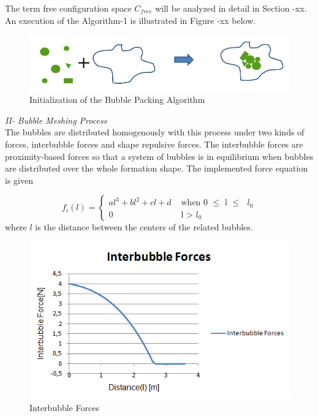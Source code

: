 \documentclass[twoside]{article}
\begin{document}
		The term free configuration space $C_{free}$ will be analyzed in detail in Section -xx. An execution of the Algorithm-1 is illustrated in Figure -xx below.
		
				\begin{figure}[H]
					\caption{Initialization of the Bubble Packing Algorithm}
					\centering
					\includegraphics[scale = 0.50]{bubble_packing}
				\end{figure}
				

			\textit{			II- Bubble Meshing Process } \\ 
	
		
		The bubbles are distributed homogenously with this process under two kinds of forces, interbubble forces and shape repulsive forces. The interbubble forces are proximity-based forces so that a system of bubbles is in equilibrium when bubbles are distributed over the whole formation shape. The implemented force equation is given
		
		\begin{equation}
		f_i(l) = \left\{ \begin{array}{rl}
		al^3 + bl^2 + cl + d &\mbox{ when 0 $\leq$ l $\leq$ $l_0$} \\
		0                               &\mbox{ l > $l_0$}
		\end{array} \right.
		\end{equation}
	where $l$ is the distance between the centers of the related bubbles. 
		\begin{figure}[H]
			\caption{Interbubble Forces}
			\centering
			\includegraphics[scale = 0.70]{interbubble_forces}
		\end{figure}
		
\end{document}

